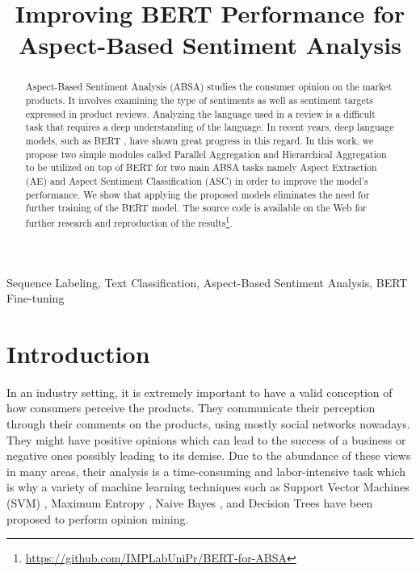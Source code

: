 \documentclass{article}
\title{Improving BERT Performance for Aspect-Based Sentiment Analysis}
\begin{document}
\maketitle
\begin{abstract}
	Aspect-Based Sentiment Analysis (ABSA) studies the consumer opinion on the market products. It involves examining the type of sentiments as well as sentiment targets expressed in product reviews. Analyzing the language used in a review is a difficult task that requires a deep understanding of the language. In recent years, deep language models, such as BERT  \cite{devlin2019bert}, have shown great progress in this regard. In this work, we propose two simple modules called Parallel Aggregation and Hierarchical Aggregation to be utilized on top of BERT for two main ABSA tasks namely Aspect Extraction (AE) and Aspect Sentiment Classification (ASC) in order to improve the model's performance. We show that applying the proposed models eliminates the need for further training of the BERT model. The source code is available on the Web for further research and reproduction of the results\footnote{\url{https://github.com/IMPLabUniPr/BERT-for-ABSA}}.
\end{abstract}
\begin{keywords}
	Sequence Labeling, Text Classification, Aspect-Based Sentiment Analysis, BERT Fine-tuning
\end{keywords}


\section{Introduction}

In an industry setting, it is extremely important to have a valid conception of how consumers perceive the products. They communicate their perception through their comments on the products, using mostly social networks nowadays. They might have positive opinions which can lead to the success of a business or negative ones possibly leading to its demise. Due to the abundance of these views in many areas, their analysis is a time-consuming and labor-intensive task which is why a variety of machine learning techniques such as Support Vector Machines (SVM) \cite{cortes1995support, kiritchenko2014nrc}, Maximum Entropy \cite{jaynes1957information, nigam1999using}, Naive Bayes \cite{duda1973pattern, gamallo2014citius}, and Decision Trees \cite{quinlan1986induction, wakade2012text} have been proposed to perform opinion mining. 
\end{document}
